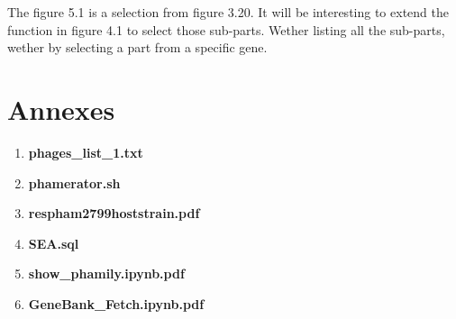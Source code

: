 \documentclass[a4paper,11pt]{report}
\begin{document}
The figure 5.1 is a selection from figure 3.20. It will be interesting to extend the function in figure 4.1 to select those sub-parts. Wether listing all the sub-parts, wether by selecting a part from a specific gene.

\addtocounter{chapter}{1}
\listoffigures

\addtocounter{chapter}{1}


\chapter{Annexes}
\begin{enumerate}
	\item \textbf{phages\_list\_1.txt}
	\item \textbf{phamerator.sh}
	\item \textbf{respham2799hoststrain.pdf}
	\item \textbf{SEA.sql}
	\item \textbf{show\_phamily.ipynb.pdf}
	\item \textbf{GeneBank\_Fetch.ipynb.pdf}
\end{enumerate}
\end{document}

